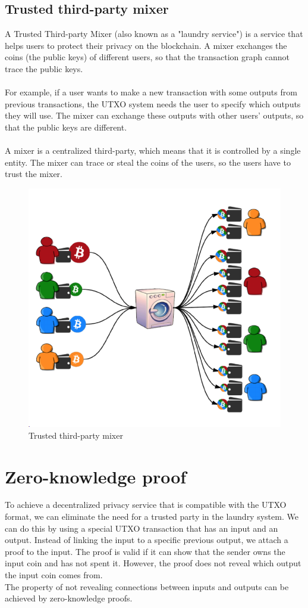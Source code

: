 \subsection{Trusted third-party mixer}
A Trusted Third-party Mixer (also known as a "laundry service") is a service that helps users to protect their privacy on the blockchain. A mixer exchanges the coins (the public keys) of different users, so that the transaction graph cannot trace the public keys. \\\\
For example, if a user wants to make a new transaction with some outputs from previous transactions, the UTXO system needs the user to specify which outputs they will use. The mixer can exchange these outputs with other users’ outputs, so that the public keys are different.\\\\
A mixer is a centralized third-party, which means that it is controlled by a single entity. The mixer can trace or steal the coins of the users, so the users have to trust the mixer.
\begin{figure}[h!]
	\centering
	\includegraphics[width=0.3\linewidth]{Fig/19/F3}
	\caption{Trusted third-party mixer}
	\label{fig:L19_f3}
\end{figure}
\section{Zero-knowledge proof}
To achieve a decentralized privacy service that is compatible with the UTXO format, we can eliminate the need for a trusted party in the laundry system. We can do this by using a special UTXO transaction that has an input and an output. Instead of linking the input to a specific previous output, we attach a proof to the input. The proof is valid if it can show that the sender owns the input coin and has not spent it. However, the proof does not reveal which output the input coin comes from.\\
The property of not revealing connections between inputs and outputs can be achieved by
zero-knowledge proofs.
